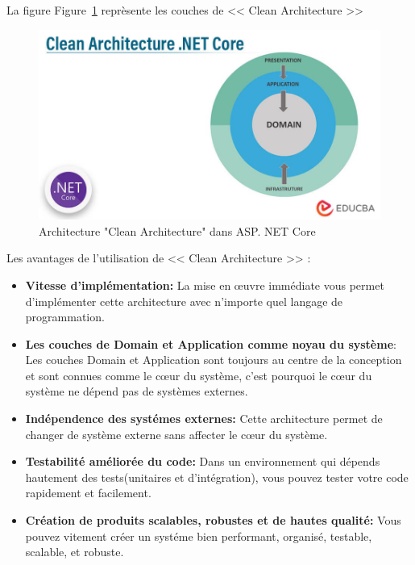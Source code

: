 \noindent
La figure Figure~\ref{fig:architecture} reprèsente les couches de << Clean Architecture >>

\begin{figure}[H]
\centering
\includegraphics[width=1\textwidth]{logos/clean_architecture.png}
\caption{Architecture "Clean Architecture" dans ASP. NET Core}
\label{fig:architecture}
\end{figure}

\noindent
Les avantages de l’utilisation de  << Clean Architecture >> :

\begin{itemize}[label={---}]
    \item \small\textbf{Vitesse d'implémentation: } La mise en œuvre immédiate vous permet d'implémenter cette architecture avec n'importe quel langage de programmation.

    \item \small\textbf{Les couches de Domain et Application comme noyau du système}: Les couches Domain et Application sont toujours au centre de la conception et sont connues comme le cœur du système, c'est pourquoi le cœur du système ne dépend pas de systèmes externes. 

    \item \small\textbf{Indépendence des systémes externes: } Cette architecture permet de changer de système externe sans affecter le cœur du système.

    \item \small\textbf{Testabilité améliorée du code: } Dans un environnement qui dépends hautement des tests(unitaires et d'intégration), vous pouvez tester votre code rapidement et facilement.    

    \item \small\textbf{Création de produits scalables, robustes et de hautes qualité: } Vous pouvez vitement créer un systéme bien performant, organisé, testable, scalable, et robuste.
\end{itemize}
\noindent